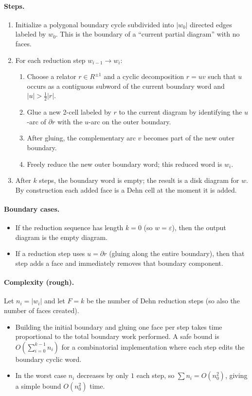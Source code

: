 \documentclass[11pt]{article}
\theoremstyle{definition}
\theoremstyle{plain}
\theoremstyle{remark}
\begin{document}
\paragraph{Steps.}
\begin{enumerate}[leftmargin=2.2em]
\item Initialize a polygonal boundary cycle subdivided into $|w_0|$ directed edges labeled by $w_0$.
This is the boundary of a ``current partial diagram'' with no faces.
\item For each reduction step $w_{i-1}\to w_i$:
\begin{enumerate}[leftmargin=2em]
\item Choose a relator $r\in R^{\pm1}$ and a cyclic decomposition $r=uv$ such that $u$ occurs as a contiguous subword of the current boundary word
and $|u|>\tfrac12|r|$.
\item Glue a new 2-cell labeled by $r$ to the current diagram by identifying the $u$-arc of $\partial r$ with the $u$-arc on the outer boundary.
\item After gluing, the complementary arc $v$ becomes part of the new outer boundary.
\item Freely reduce the new outer boundary word; this reduced word is $w_i$.
\end{enumerate}
\item After $k$ steps, the boundary word is empty; the result is a disk diagram for $w$.
By construction each added face is a Dehn cell at the moment it is added.
\end{enumerate}


\paragraph{Boundary cases.}
\begin{itemize}[leftmargin=2em]
\item If the reduction sequence has length $k=0$ (so $w=\varepsilon$), then the output diagram is the empty diagram.
\item If a reduction step uses $u=\partial r$ (gluing along the entire boundary), then that step adds a face and immediately removes that boundary component.
\end{itemize}

\paragraph{Complexity (rough).}\cite{dehn1911,greendlinger1960,lyndonschupp1977}
Let $n_i=|w_i|$ and let $F=k$ be the number of Dehn reduction steps (so also the number of faces created).
\begin{itemize}[leftmargin=2em]
\item Building the initial boundary and gluing one face per step takes time proportional to the total boundary work performed.
A safe bound is $O\!\left(\sum_{i=0}^{k-1} n_i\right)$ for a combinatorial implementation where each step edits the boundary cyclic word.
\item In the worst case $n_i$ decreases by only $1$ each step, so $\sum n_i=O(n_0^2)$, giving a simple bound $O(n_0^2)$ time.
\end{itemize}
\end{document}
